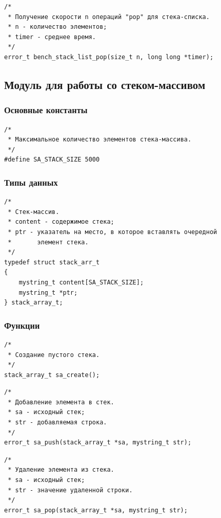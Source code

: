 \documentclass[a4paper,12pt]{extarticle}
\begin{document}
\begin{verbatim}
/*
 * Получение скорости n операций "pop" для стека-списка.
 * n - количество элементов;
 * timer - среднее время.
 */
error_t bench_stack_list_pop(size_t n, long long *timer);
\end{verbatim}

\subsection{Модуль для работы со стеком-массивом}
\subsubsection{Основные константы}
\begin{verbatim}
/*
 * Максимальное количество элементов стека-массива.
 */
#define SA_STACK_SIZE 5000
\end{verbatim}

\subsubsection{Типы данных}

\begin{verbatim}
/*
 * Стек-массив.
 * content - содержимое стека;
 * ptr - указатель на место, в которое вставлять очередной
 *       элемент стека.
 */
typedef struct stack_arr_t
{
    mystring_t content[SA_STACK_SIZE];
    mystring_t *ptr;
} stack_array_t;
\end{verbatim}

\subsubsection{Функции}

\begin{verbatim}
/*
 * Создание пустого стека.
 */
stack_array_t sa_create();
\end{verbatim}

\begin{verbatim}
/*
 * Добавление элемента в стек.
 * sa - исходный стек;
 * str - добавляемая строка.
 */
error_t sa_push(stack_array_t *sa, mystring_t str);
\end{verbatim}

\begin{verbatim}
/*
 * Удаление элемента из стека.
 * sa - исходный стек;
 * str - значение удаленной строки.
 */
error_t sa_pop(stack_array_t *sa, mystring_t str);
\end{verbatim}
\end{document}
